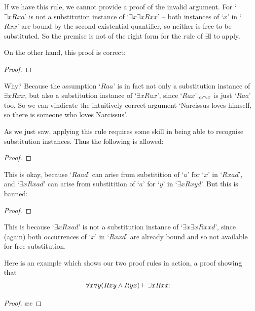 If we have this rule, we cannot provide a proof of the invalid argument. For `$\exists x Rxa$' is not a substitution instance of `$\exists x \exists x Rxx$' – both instances of `$x$' in `$Rxx$' are bound by the second existential quantifier, so neither is free to be substituted. So the premise is not of the right form for the rule of $\exists$I to apply. 

On the other hand, this proof is correct:
\begin{proof}
\end{proof} Why? Because the assumption `$Raa$' is in fact not only a substitution instance of $\exists x Rxx$, but also a substitution instance of `$\exists x Rax$', since `$Rax$'$\vert_{a\curvearrowright x}$ is just `$Raa$' too. So we can vindicate the intuitively correct argument `Narcissus loves himself, so there is someone who loves Narcissus'. 

As we just saw, applying this rule requires some skill in being able to recognise substitution instances. Thus the following is allowed:
\begin{proof}
	 
	 
\end{proof} This is okay, because `$Raad$' can arise from substitition of `$a$' for `$x$' in `$Rxad$', and `$\exists x Rxad$' can arise from substitition of `$a$' for `$y$' in `$\exists x Rxyd$'.
But this is banned:
\begin{proof}
	 
\end{proof} This is because `$\exists x Rxad$' is not a substitution instance of `$\exists x \exists x Rxxd$', since (again) both occurrences of `$x$' in `$Rxxd$' are already bound and so not available for free substitution.

Here is an example which shows our two proof rules in action, a proof showing that $$\forall x \forall y (Rxy \wedge Ryx) \vdash \exists x Rxx\text{:}$$ \begin{proof}
	\ae{c}
\end{proof}

